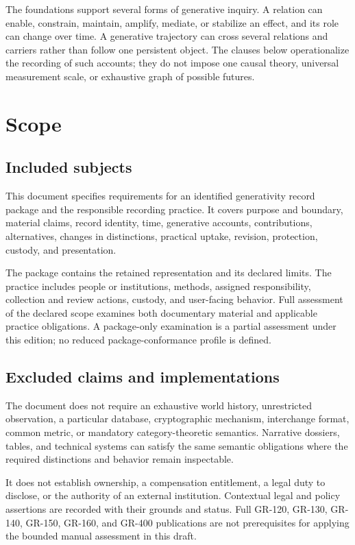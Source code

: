 \documentclass[11pt,a4paper]{article}
\begin{document}
The foundations support several forms of generative inquiry. A relation can enable, constrain, maintain, amplify, mediate, or stabilize an effect, and its role can change over time. A generative trajectory can cross several relations and carriers rather than follow one persistent object. The clauses below operationalize the recording of such accounts; they do not impose one causal theory, universal measurement scale, or exhaustive graph of possible futures.

\GSPmainmatter
\section{Scope}
\subsection{Included subjects}
This document specifies requirements for an identified generativity record package and the responsible recording practice. It covers purpose and boundary, material claims, record identity, time, generative accounts, contributions, alternatives, changes in distinctions, practical uptake, revision, protection, custody, and presentation.

The package contains the retained representation and its declared limits. The practice includes people or institutions, methods, assigned responsibility, collection and review actions, custody, and user-facing behavior. Full assessment of the declared scope examines both documentary material and applicable practice obligations. A package-only examination is a partial assessment under this edition; no reduced package-conformance profile is defined.

\subsection{Excluded claims and implementations}
The document does not require an exhaustive world history, unrestricted observation, a particular database, cryptographic mechanism, interchange format, common metric, or mandatory category-theoretic semantics. Narrative dossiers, tables, and technical systems can satisfy the same semantic obligations where the required distinctions and behavior remain inspectable.

It does not establish ownership, a compensation entitlement, a legal duty to disclose, or the authority of an external institution. Contextual legal and policy assertions are recorded with their grounds and status. Full GR-120, GR-130, GR-140, GR-150, GR-160, and GR-400 publications are not prerequisites for applying the bounded manual assessment in this draft.
\end{document}
